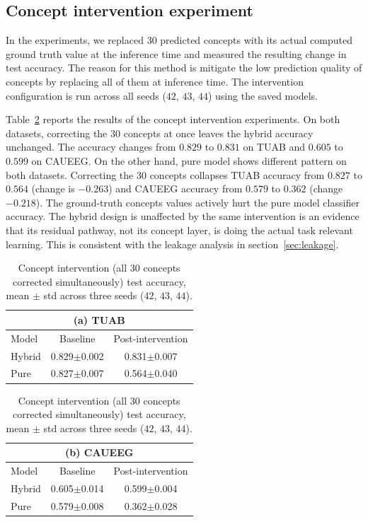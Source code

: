 \documentclass[journal,twoside,web]{ieeecolor}
\begin{document}
\subsection{Concept intervention experiment}
\label{sec:intervention}

In the experiments, we replaced $30$ predicted concepts with its actual computed ground truth value at the inference time and measured the resulting change in test accuracy. The reason for this method is mitigate the low prediction quality of concepts by replacing all of them at inference time. The intervention configuration is run across all seeds ($42$, $43$, $44$) using the saved models.

Table~\ref{tab:intervention} reports the results of the concept intervention experiments. On both datasets, correcting the $30$ concepts at once leaves the hybrid accuracy unchanged. The accuracy changes from $0.829$ to $0.831$ on TUAB and $0.605$ to $0.599$ on CAUEEG. On the other hand, pure model shows different pattern on both datasets. Correcting the $30$ concepts collapses TUAB accuracy from $0.827$ to $0.564$ (change is $-0.263$) and CAUEEG accuracy from $0.579$ to $0.362$ (change $-0.218$). The ground-truth concepts values actively hurt the pure model classifier accuracy. The hybrid design is unaffected by the same intervention is an evidence that its residual pathway, not its concept layer, is doing the actual task relevant learning. This is consistent with  the leakage analysis in section~\ref{sec:leakage}.

\begin{table}[h]
\caption{Concept intervention (all $30$ concepts corrected simultaneously) test accuracy, mean $\pm$ std across three seeds ($42$, $43$, $44$).}
\label{tab:intervention}
\centering

\begin{tabular}{l cc}
\multicolumn{3}{c}{(a) TUAB} \\
\hline
Model & Baseline & Post-intervention  \\
\hline
Hybrid & 0.829$\pm$0.002 & 0.831$\pm$0.007  \\
Pure   & 0.827$\pm$0.007 & 0.564$\pm$0.040 \\
\hline
\end{tabular}

\vspace{1em}

\begin{tabular}{l cc}
\multicolumn{3}{c}{(b) CAUEEG} \\
\hline
Model & Baseline & Post-intervention  \\
\hline
Hybrid & 0.605$\pm$0.014 & 0.599$\pm$0.004  \\
Pure   & 0.579$\pm$0.008 & 0.362$\pm$0.028  \\
\hline
\end{tabular}

\end{table}
\end{document}

